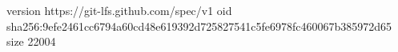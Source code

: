 version https://git-lfs.github.com/spec/v1
oid sha256:9efe2461cc6794a60cd48e619392d725827541c5fe6978fc460067b385972d65
size 22004
